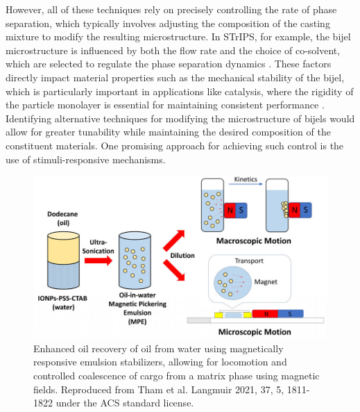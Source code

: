 However, all of these techniques rely on precisely controlling the rate of phase separation, which typically involves adjusting the composition 
of the casting mixture to modify the resulting microstructure. In STrIPS, for example, the bijel microstructure is influenced by both the flow rate 
and the choice of co-solvent, which are selected to regulate the phase separation dynamics \cite{haase_continuous_2015}. These factors directly 
impact material properties such as the mechanical stability of the bijel, which is particularly important in applications like catalysis, where the 
rigidity of the particle monolayer is essential for maintaining consistent performance 
\cite{reeves_particle-size_2015, haase_situ_2016, boakye-ansah_controlling_2020}. Identifying alternative techniques for modifying the microstructure of 
bijels would allow for greater tunability while maintaining the desired composition of the constituent materials. One promising approach for achieving 
such control is the use of stimuli-responsive mechanisms.  

\begin{figure}[h]
    \centering
    \includegraphics[scale = 1]{figures/introduction/magnetophoresis_emulsion.jpeg}
    \caption{Enhanced oil recovery of oil from water using magnetically responsive emulsion stabilizers, allowing for 
             locomotion and controlled coalescence of cargo from a matrix phase using magnetic fields. \cite{tham_magnetophoresis_2021} 
             Reproduced from Tham et al. Langmuir 2021, 37, 5, 1811-1822 under the ACS standard license.}
    \label{fig:magnetophoresis_droplet}
\end{figure}

